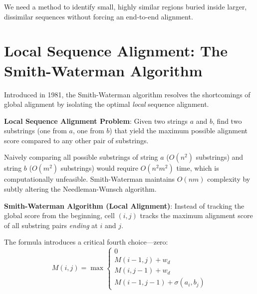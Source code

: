\sta We need a method to identify small, highly similar regions buried inside larger, dissimilar sequences without forcing an end-to-end alignment.

\section{Local Sequence Alignment: The Smith-Waterman Algorithm}

Introduced in 1981, the Smith-Waterman algorithm resolves the shortcomings of global alignment by isolating the optimal \textit{local} sequence alignment. 

\begin{important}
    \textbf{Local Sequence Alignment Problem}: Given two strings $a$ and $b$, find two substrings (one from $a$, one from $b$) that yield the maximum possible alignment score compared to any other pair of substrings.
\end{important}

Naively comparing all possible substrings of string $a$ ($O(n^2)$ substrings) and string $b$ ($O(m^2)$ substrings) would require $O(n^2 m^2)$ time, which is computationally unfeasible. Smith-Waterman maintains $O(nm)$ complexity by subtly altering the Needleman-Wunsch algorithm.

\begin{important}
  \textbf{Smith-Waterman Algorithm (Local Alignment)}:
  Instead of tracking the global score from the beginning, cell $(i,j)$ tracks the maximum alignment score of all substring pairs \textit{ending} at $i$ and $j$. 
  
  The formula introduces a critical fourth choice—zero:
  \begin{equation}
  M(i, j) = \max \begin{cases} 
  0 \\
  M(i-1, j) + w_d \\
  M(i, j-1) + w_d \\
  M(i-1, j-1) + \sigma(a_i, b_j)
  \end{cases}
  \label{eq:smithwaterman}
  \end{equation}
\end{important}

